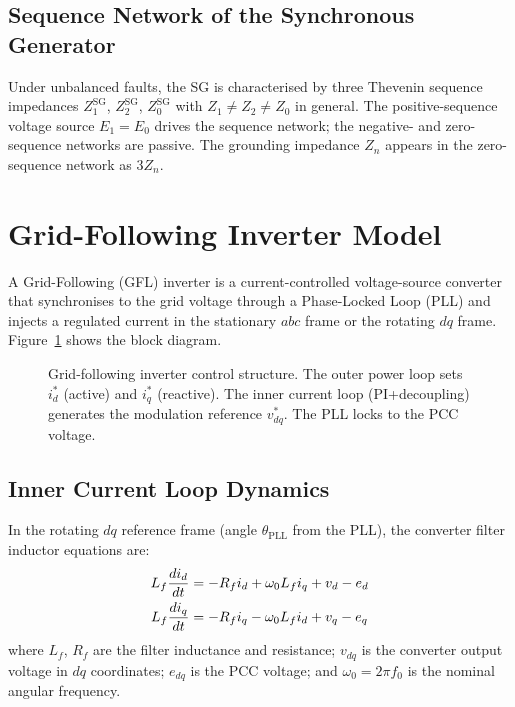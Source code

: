\subsection{Sequence Network of the Synchronous Generator}

Under unbalanced faults, the SG is characterised by three Thevenin
sequence impedances $Z_1^\mathrm{SG}$, $Z_2^\mathrm{SG}$, $Z_0^\mathrm{SG}$
with $Z_1 \neq Z_2 \neq Z_0$ in general. The positive-sequence voltage
source $E_1 = E_0$ drives the sequence network; the negative- and
zero-sequence networks are passive. The grounding impedance $Z_n$ appears
in the zero-sequence network as $3Z_n$.

\section{Grid-Following Inverter Model}
\label{sec:ch2_gfl}

A Grid-Following (GFL) inverter is a current-controlled voltage-source
converter that synchronises to the grid voltage through a Phase-Locked Loop
(PLL) and injects a regulated current in the stationary $abc$ frame or the
rotating $dq$ frame. Figure~\ref{fig:ch2_gfl_structure} shows the block
diagram.

\begin{figure}[htbp]
  \centering
  
  \caption{Grid-following inverter control structure. The outer power
           loop sets $i_d^\ast$ (active) and $i_q^\ast$ (reactive). The
           inner current loop (PI+decoupling) generates the modulation
           reference $v^\ast_{dq}$. The PLL locks to the PCC voltage.}
  \label{fig:ch2_gfl_structure}
\end{figure}

\subsection{Inner Current Loop Dynamics}

In the rotating $dq$ reference frame (angle $\theta_\mathrm{PLL}$ from the PLL),
the converter filter inductor equations are:
\begin{align}
  L_f \frac{di_d}{dt} &= -R_f i_d + \omega_0 L_f i_q + v_d - e_d
  \label{eq:ch2_gfl_id} \\
  L_f \frac{di_q}{dt} &= -R_f i_q - \omega_0 L_f i_d + v_q - e_q
  \label{eq:ch2_gfl_iq}
\end{align}
where $L_f$, $R_f$ are the filter inductance and resistance; $v_{dq}$ is the
converter output voltage in $dq$ coordinates; $e_{dq}$ is the PCC voltage;
and $\omega_0 = 2\pi f_0$ is the nominal angular frequency.


